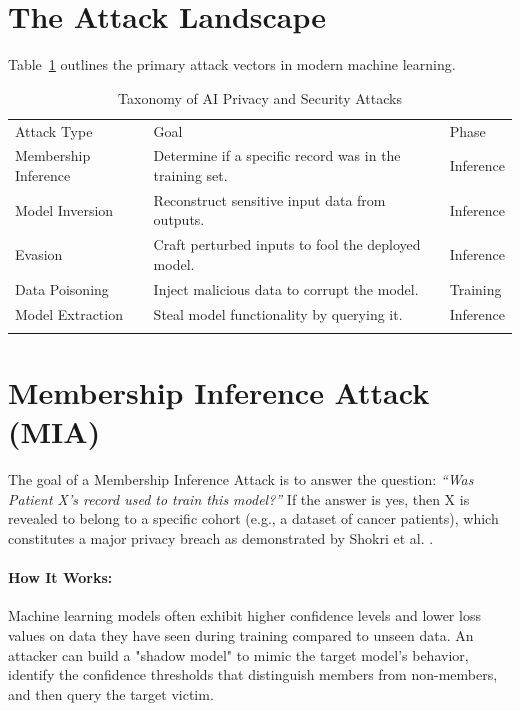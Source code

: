 \section{The Attack Landscape}
\label{sec:attack_landscape}

Table~\ref{tab:attack_taxonomy} outlines the primary attack vectors in modern machine learning.

\begin{table}
\caption{Taxonomy of AI Privacy and Security Attacks}
\label{tab:attack_taxonomy}
\begin{tabular}{p{3.5cm}p{5cm}p{2cm}}
\hline\noalign{\smallskip}
Attack Type & Goal & Phase \\
\noalign{\smallskip}\svhline\noalign{\smallskip}
Membership Inference & Determine if a specific record was in the training set. & Inference \\
Model Inversion & Reconstruct sensitive input data from outputs. & Inference \\
Evasion & Craft perturbed inputs to fool the deployed model. & Inference \\
Data Poisoning & Inject malicious data to corrupt the model. & Training \\
Model Extraction & Steal model functionality by querying it. & Inference \\
\noalign{\smallskip}\hline\noalign{\smallskip}
\end{tabular}
\end{table}

\section{Membership Inference Attack (MIA)}
\label{sec:mia}

The goal of a Membership Inference Attack is to answer the question: \textit{``Was Patient X's record used to train this model?''} If the answer is yes, then X is revealed to belong to a specific cohort (e.g., a dataset of cancer patients), which constitutes a major privacy breach as demonstrated by Shokri et al. \cite{shokri2017}.

\paragraph{How It Works:} Machine learning models often exhibit higher confidence levels and lower loss values on data they have seen during training compared to unseen data. An attacker can build a "shadow model" to mimic the target model's behavior, identify the confidence thresholds that distinguish members from non-members, and then query the target victim.

